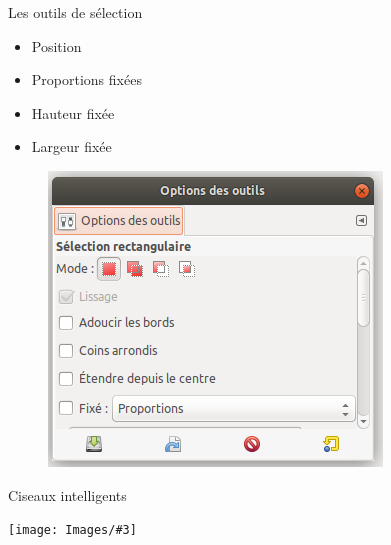 \documentclass[10pt,svgnames,usenames,table]{beamer}
\newcommand{\tool}[3]{%
	\begin{minipage}{0.40\textwidth}
	\item #1
	\end{minipage}\hfill
	\begin{minipage}{0.20\textwidth}
	\begin{flushright}
	\keys{#2}
	\end{flushright}
	\end{minipage}
	\begin{minipage}{0.06\textwidth}
	\fbox{ou}
	\end{minipage}
	\begin{minipage}{0.1\textwidth}
	\texttt{[image: Images/\#3]}
	\end{minipage}
}
\begin{document}
\begin{frame}[allowframebreaks]{Les outils de sélection}
\begin{enumerate}
\begin{minipage}[t]{0.45\textwidth}
	\begin{itemize}
		\item Position
		\item Proportions fixées
		\item Hauteur fixée
		\item Largeur fixée
	\end{itemize}
	\end{minipage}
	\begin{minipage}[t]{0.45\textwidth}

	\begin{figure}
	    	\centering
	    	\includegraphics[width=\textwidth]{Images/option_outil} 
	\end{figure}
	\end{minipage}

	\framebreak 




	\tool{Ciseaux intelligents}{I}{smart_cut.png}


\end{enumerate}
\end{frame}
\end{document}

